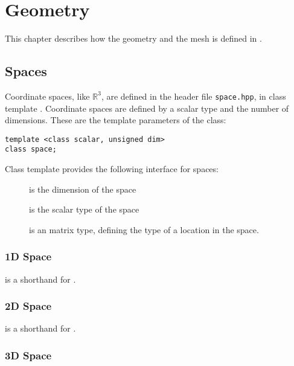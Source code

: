 \chapter{Geometry}
\label{sec:geometry}

This chapter describes how the geometry and the mesh is defined in \NiHu{}.

\section{Spaces}
\label{sec:space}

Coordinate spaces, like $\mathbb{R}^3$, are defined in the header file \texttt{space.hpp}, in class template .
Coordinate spaces are defined by a scalar type and the number of dimensions.
These are the template parameters of the  class:

\begin{lstlisting}
template <class scalar, unsigned dim>
class space;
\end{lstlisting}

Class template  provides the following interface for spaces:

\begin{description}
	\item [] is the dimension of the space
	\item [] is the scalar type of the space
	\item [] is an  matrix type, defining the type of a location in the space.
\end{description}

\subsection{1D Space}

 is a shorthand for .

\subsection{2D Space}

 is a shorthand for .

\subsection{3D Space}

